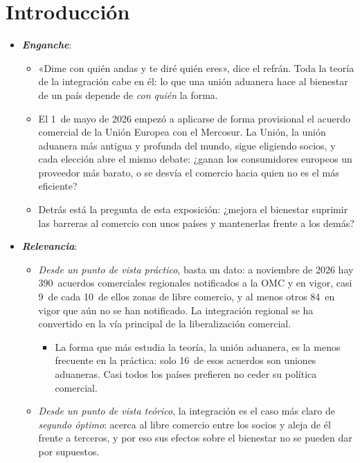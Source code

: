 \documentclass[11pt]{article}
\begin{document}
\tceetitulo

\section*{Introducción}

\begin{itemize}
\item \textbf{\emph{Enganche}}:
  \begin{itemize}
  \item «Dime con quién andas y te diré quién eres», dice el refrán. Toda la teoría de la integración cabe en él: lo que una unión aduanera hace al bienestar de un país depende de \emph{con quién} la forma.
  \item El 1~de mayo de 2026 empezó a aplicarse de forma provisional el acuerdo comercial de la Unión Europea con el Mercosur\nocite{CE2026MercosurProvisional}. La Unión, la unión aduanera más antigua y profunda del mundo, sigue eligiendo socios, y cada elección abre el mismo debate: ¿ganan los consumidores europeos un proveedor más barato, o se desvía el comercio hacia quien no es el más eficiente?
  \item Detrás está la pregunta de esta exposición: ¿mejora el bienestar suprimir las barreras al comercio con unos países y mantenerlas frente a los demás?
  \end{itemize}

\item \textbf{\emph{Relevancia}}:
  \begin{itemize}
  \item \emph{Desde un punto de vista práctico}, basta un dato: a noviembre de 2026 hay 390~acuerdos comerciales regionales notificados a la OMC y en vigor, casi 9~de cada 10~de ellos zonas de libre comercio, y al menos otros 84~en vigor que aún no se han notificado\nocite{OMC2026RTAIS,OMC2026ACR}. La integración regional se ha convertido en la vía principal de la liberalización comercial.
    \begin{itemize}
    \item La forma que más estudia la teoría, la unión aduanera, es la menos frecuente en la práctica: solo 16~de esos acuerdos son uniones aduaneras\nocite{OMC2026RTAISExportacion}. Casi todos los países prefieren no ceder su política comercial.
    \end{itemize}
  \item \emph{Desde un punto de vista teórico}, la integración es el caso más claro de \emph{segundo óptimo}: acerca al libre comercio entre los socios y aleja de él frente a terceros, y por eso sus efectos sobre el bienestar no se pueden dar por supuestos.
  \end{itemize}


\end{itemize}
\end{document}
